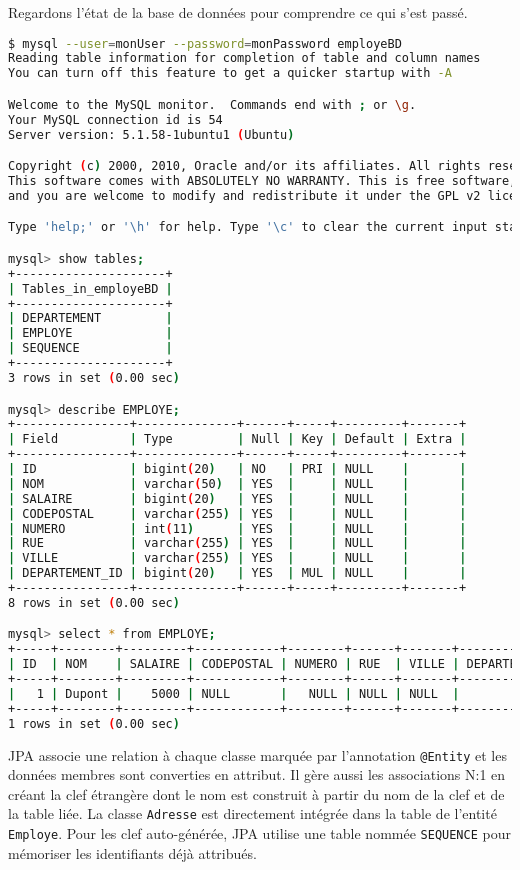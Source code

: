\documentclass[a4paper,11pt]{article}
\begin{document}
Regardons l'état de la base de données pour comprendre ce qui s'est passé.
\begin{lstlisting}[language=sh,style=customsh]
$ mysql --user=monUser --password=monPassword employeBD
Reading table information for completion of table and column names
You can turn off this feature to get a quicker startup with -A

Welcome to the MySQL monitor.  Commands end with ; or \g.
Your MySQL connection id is 54
Server version: 5.1.58-1ubuntu1 (Ubuntu)

Copyright (c) 2000, 2010, Oracle and/or its affiliates. All rights reserved.
This software comes with ABSOLUTELY NO WARRANTY. This is free software,
and you are welcome to modify and redistribute it under the GPL v2 license

Type 'help;' or '\h' for help. Type '\c' to clear the current input statement.

mysql> show tables;
+---------------------+
| Tables_in_employeBD |
+---------------------+
| DEPARTEMENT         |
| EMPLOYE             |
| SEQUENCE            |
+---------------------+
3 rows in set (0.00 sec)

mysql> describe EMPLOYE;
+----------------+--------------+------+-----+---------+-------+
| Field          | Type         | Null | Key | Default | Extra |
+----------------+--------------+------+-----+---------+-------+
| ID             | bigint(20)   | NO   | PRI | NULL    |       |
| NOM            | varchar(50)  | YES  |     | NULL    |       |
| SALAIRE        | bigint(20)   | YES  |     | NULL    |       |
| CODEPOSTAL     | varchar(255) | YES  |     | NULL    |       |
| NUMERO         | int(11)      | YES  |     | NULL    |       |
| RUE            | varchar(255) | YES  |     | NULL    |       |
| VILLE          | varchar(255) | YES  |     | NULL    |       |
| DEPARTEMENT_ID | bigint(20)   | YES  | MUL | NULL    |       |
+----------------+--------------+------+-----+---------+-------+
8 rows in set (0.00 sec)

mysql> select * from EMPLOYE;
+-----+--------+---------+------------+--------+------+-------+----------------+
| ID  | NOM    | SALAIRE | CODEPOSTAL | NUMERO | RUE  | VILLE | DEPARTEMENT_ID |
+-----+--------+---------+------------+--------+------+-------+----------------+
|   1 | Dupont |    5000 | NULL       |   NULL | NULL | NULL  |           NULL |
+-----+--------+---------+------------+--------+------+-------+----------------+
1 rows in set (0.00 sec)
\end{lstlisting}
JPA associe une relation à chaque classe marquée par l'annotation \texttt{@Entity} et les données membres sont converties 
en attribut. Il gère aussi les associations N:1 en créant la clef étrangère dont le nom est construit à partir du nom de 
la clef et de la table liée. La classe \texttt{Adresse} est directement intégrée dans la table de l'entité \texttt{Employe}.
Pour les clef auto-générée, JPA utilise une table nommée \texttt{SEQUENCE} pour mémoriser les identifiants déjà attribués.
\end{document}
